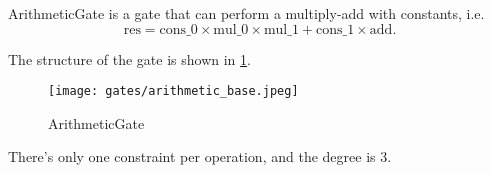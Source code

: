 
\hspace*{\fill}

\indent ArithmeticGate is a gate that can perform a multiply-add with constants, i.e.
\[ \text{res} = \text{cons\_0} \times \text{mul\_0} \times \text{mul\_1} + \text{cons\_1} \times \text{add}. \]

The structure of the gate is shown in \ref{fig:arithmetic-gate}.

\begin{figure}[!ht]
    \centering
    \texttt{[image: gates/arithmetic\_base.jpeg]}
    \caption{ArithmeticGate}
    \label{fig:arithmetic-gate}
\end{figure}

There's only one constraint per operation, and the degree is 3.
